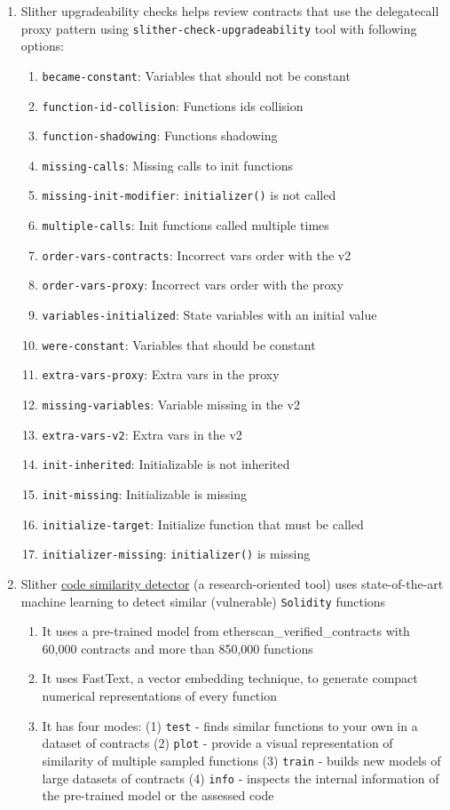 \begin{enumerate}
\item Slither upgradeability checks helps review contracts that use the delegatecall proxy pattern using \verb|slither-check-upgradeability| tool with following options:
	\begin{enumerate}
	\item\verb|became-constant|: Variables that should not be constant
	\item\verb|function-id-collision|: Functions ids collision
	\item\verb|function-shadowing|: Functions shadowing
	\item\verb|missing-calls|: Missing calls to init functions
	\item\verb|missing-init-modifier|: \verb|initializer()| is not called
	\item\verb|multiple-calls|: Init functions called multiple times
	\item\verb|order-vars-contracts|: Incorrect vars order with the v2
	\item\verb|order-vars-proxy|: Incorrect vars order with the proxy
	\item\verb|variables-initialized|: State variables with an initial value
	\item\verb|were-constant|: Variables that should be constant
	\item\verb|extra-vars-proxy|: Extra vars in the proxy
	\item\verb|missing-variables|: Variable missing in the v2
	\item\verb|extra-vars-v2|: Extra vars in the v2
	\item\verb|init-inherited|: Initializable is not inherited
	\item\verb|init-missing|: Initializable is missing
	\item\verb|initialize-target|: Initialize function that must be called
	\item\verb|initializer-missing|: \verb|initializer()| is missing
	\end{enumerate}

\item Slither \href{https://blog.trailofbits.com/2020/10/23/efficient-audits-with-machine-learning-and-slither-simil/}{code similarity detector} (a research-oriented tool) uses state-of-the-art machine learning to detect similar (vulnerable) \verb|Solidity| functions
	\begin{enumerate}
	\item It uses a pre-trained model from etherscan\_verified\_contracts with 60,000 contracts and more than 850,000 functions
	\item It uses FastText, a vector embedding technique, to generate compact numerical representations of every function
	\item It has four modes: (1) \verb|test| - finds similar functions to your own in a dataset of contracts (2) \verb|plot| - provide a visual representation of similarity of multiple sampled functions (3) \verb|train| - builds new models of large datasets of contracts (4) \verb|info| - inspects the internal information of the pre-trained model or the assessed code
	\end{enumerate}


\end{enumerate}
